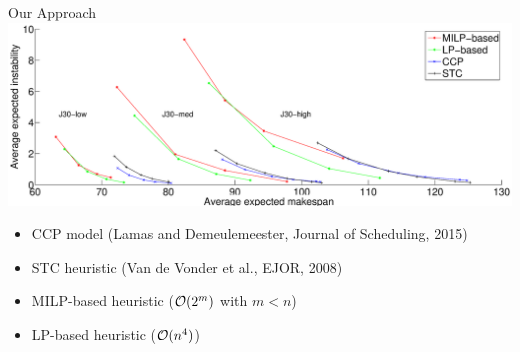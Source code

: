 \begin{frame}{Our Approach}
\includegraphics[width=1.05\textwidth]{../figure1.eps}
\medskip
\begin{itemize}
	\item \color{blue}CCP model (Lamas and Demeulemeester, Journal of Scheduling, 2015)\color{black}
	\item STC heuristic (Van de Vonder et al., EJOR, 2008)
	\item \color{red}MILP-based heuristic \color{black} ($\mathcal{O}(2^m)$ with $m < n$)
	\item \color{green}LP-based heuristic \color{black} ($\mathcal{O}(n^4)$)
\end{itemize}
\end{frame}

